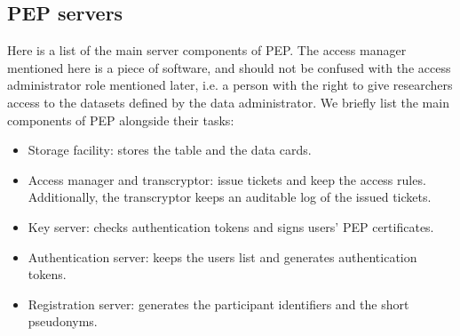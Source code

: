 \documentclass{report}
\begin{document}
\subsection{PEP servers}\label{pep_servers}
Here is a list of the main server components of PEP. The access manager mentioned here is a piece of software, and should not be confused with the access administrator role mentioned
later, i.e. a person with the right to give researchers access to the datasets defined by the data administrator. We briefly list the main components of PEP alongside their tasks:
\begin{itemize}
		\item Storage facility: stores the table and the data cards.
		\item Access manager and transcryptor: issue tickets and keep the access rules. Additionally, the transcryptor keeps an auditable log of the issued tickets.
		\item Key server: checks authentication tokens and signs users' PEP certificates.
		\item Authentication server: keeps the users list and generates authentication tokens. 
		\item Registration server: generates the participant identifiers and the short pseudonyms.
\end{itemize}
\end{document}
